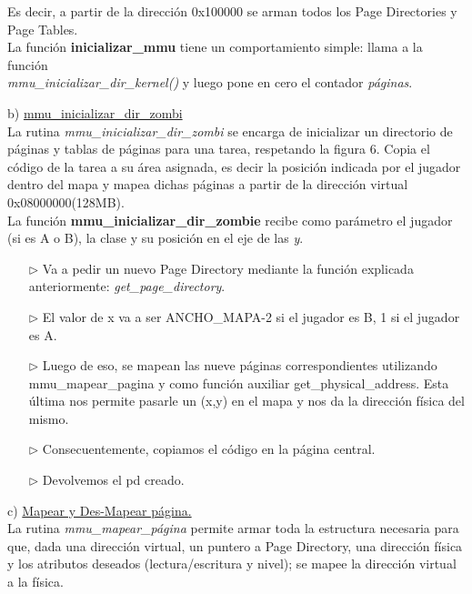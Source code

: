 \documentclass[a4paper]{article}
\begin{document}
Es decir, a partir de la direcci\'on 0x100000 se arman todos los Page Directories y Page Tables.\\



La funci\'on \textbf{inicializar_mmu} tiene un comportamiento simple: llama a la funci\'on \\ \textit{mmu_inicializar_dir_kernel()} y luego pone en cero el contador\textit{ p\'aginas}.\\

\bigskip

{\large b)} \underline{mmu_inicializar_dir_zombi}\\

La rutina \textit{mmu_inicializar_dir_zombi} se encarga de inicializar un directorio
de p\'aginas y tablas de p\'aginas para una tarea, respetando la figura 6. Copia
el c\'odigo de la tarea a su \'area asignada, es decir la posici\'on indicada por el jugador dentro
del mapa y mapea dichas p\'aginas a partir de la direcci\'on virtual 0x08000000(128MB).\\

La funci\'on \textbf{mmu_inicializar_dir_zombie} recibe como par\'ametro el jugador (si es A o B), la clase y su posici\'on en el eje de las \emph{y}. 

\begin{itemize}
\item[$\triangleright$] Va a pedir un nuevo Page Directory mediante la funci\'on explicada anteriormente: \textit{get_page_directory}.
\item[$\triangleright$] El valor de x va a ser ANCHO_MAPA-2 si el jugador es B, 1 si el jugador es A.
\item[$\triangleright$] Luego de eso, se mapean las nueve p\'aginas correspondientes utilizando mmu_mapear_pagina y como funci\'on auxiliar get_physical_address. Esta \'ultima nos permite pasarle un (x,y) en el mapa y nos da la direcci\'on f\'isica del mismo.
\item[$\triangleright$] Consecuentemente, copiamos el c\'odigo en la p\'agina central.
\item[$\triangleright$] Devolvemos el pd creado.
\end{itemize}



\bigskip

{\large c)} \underline{Mapear y Des-Mapear p\'agina.}\\

 La rutina \textit{mmu_mapear_p\'agina} permite armar toda la estructura necesaria para que, dada una direcci\'on virtual, un puntero a Page Directory, una direcci\'on f\'isica y los atributos deseados (lectura/escritura y nivel); se mapee la direcci\'on virtual a la f\'isica.\\
 
\end{document}
